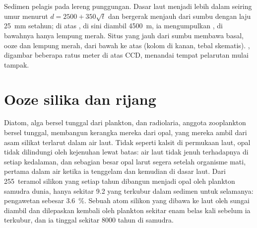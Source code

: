 \begin{omfigure}

{\small Sedimen pelagis pada lereng punggungan. Dasar laut menjadi lebih dalam seiring umur menurut  $d = 2500 + 350\sqrt t$ dan bergerak menjauh dari sumbu dengan laju \qty{25}{mm} setahun; di atas , di sini diambil \qty{4500}{m}, ia mengumpulkan , di bawahnya hanya lempung merah. Situs yang jauh dari sumbu membawa basal, ooze dan lempung merah, dari bawah ke atas (kolom di kanan, tebal skematis). , digambar beberapa ratus meter di atas CCD, menandai tempat pelarutan mulai tampak.}
\label{fig:b1:chemical-biogenic-sediments:flank}
\end{omfigure}

\section{Ooze silika dan rijang}\label{sec:b1:chemical-biogenic-sediments:silica}

Diatom, alga bersel tunggal dari plankton, dan radiolaria, anggota zooplankton bersel tunggal, membangun kerangka mereka dari opal, yang mereka ambil dari asam silikat terlarut dalam air laut. Tidak seperti kalsit di permukaan laut, opal tidak dilindungi oleh kejenuhan lewat batas: air laut tidak jenuh terhadapnya di setiap kedalaman, dan sebagian besar opal larut segera setelah organisme mati, pertama dalam air ketika ia tenggelam dan kemudian di dasar laut. Dari 255~teramol silikon yang setiap tahun dibangun menjadi opal oleh plankton samudra dunia, hanya sekitar 9.2 yang terkubur dalam sedimen untuk selamanya: pengawetan sebesar \qty{3.6}{\%}. Sebuah atom silikon yang dibawa ke laut oleh sungai diambil dan dilepaskan kembali oleh plankton sekitar enam belas kali sebelum ia terkubur, dan ia tinggal sekitar \num{8000} tahun di samudra.

